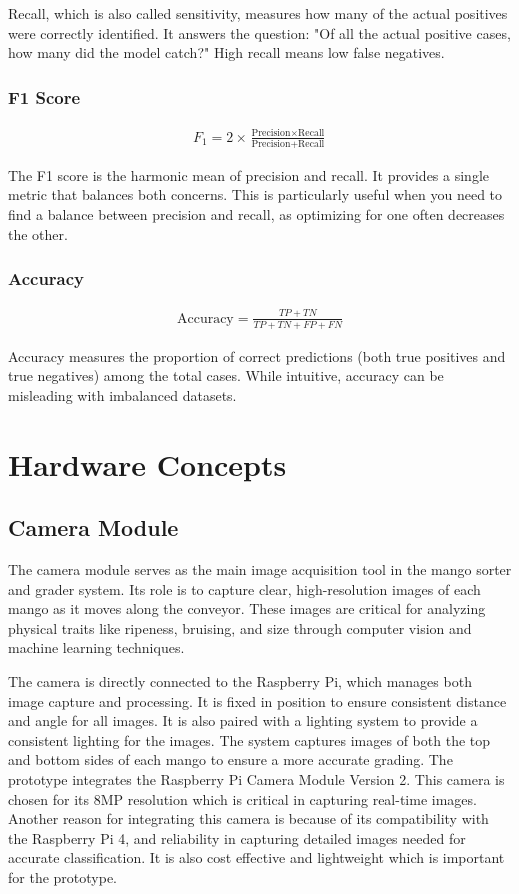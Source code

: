 Recall, which is also called sensitivity, measures how many of the actual positives were correctly identified. 
It answers the question: 
"Of all the actual positive cases, how many did the model catch?" High recall means low false negatives.

\subsubsection{F1 Score}
\begin{eqnarray}
	F_1 = 2\times \frac{\text{Precision} \times \text{Recall}}{\text{Precision} + \text{Recall}}
	\label{eq:f1_score}
\end{eqnarray}

The F1 score is the harmonic mean of precision and recall. It provides a single metric that balances 
both concerns. This is particularly useful when you need to 
find a balance between precision and recall, as optimizing for one often decreases the other.

\subsubsection{Accuracy}
\begin{eqnarray}
	\text{Accuracy} = \frac{TP + TN}{TP + TN + FP + FN}
	\label{eq:accuracy}
\end{eqnarray}

Accuracy measures the proportion of correct predictions (both true positives and true negatives)
 among the total cases. While intuitive, accuracy can be misleading with imbalanced datasets.

\section{Hardware Concepts}

\subsection{Camera Module} 

The camera module serves as the main image acquisition tool in the mango sorter
and grader system. Its role is to capture clear, high-resolution images of each
mango as it moves along the conveyor. These images are critical for analyzing
physical traits like ripeness, bruising, and size through computer vision and
machine learning techniques.

The camera is directly connected to the Raspberry Pi, which manages both image
capture and processing. It is fixed in position to ensure consistent distance
and angle for all images. It is also paired with a lighting system to provide a
consistent lighting for the images. The system captures images of both the top
and bottom sides of each mango to ensure a more accurate grading. The prototype
integrates the Raspberry Pi Camera Module Version 2. This camera is chosen for
its 8MP resolution which is critical in capturing real-time images. Another
reason for integrating this camera is because of its compatibility with the
Raspberry Pi 4, and reliability in capturing detailed images needed for accurate
classification. It is also cost effective and lightweight which is important for
the prototype.


